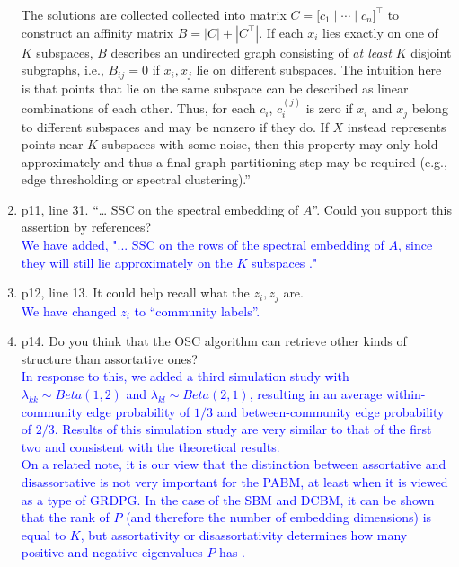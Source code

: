 \documentclass[
]{article}
\begin{document}
\begin{enumerate}
{  The solutions are collected collected into matrix
  \(C = \bigl[ c_1 \mid \cdots \mid c_n \bigr]^\top\) to
  construct an affinity matrix \(B = |C| + |C^\top|\). If each \(x_i\) lies
  exactly on one of \(K\) subspaces, \(B\) describes an undirected graph
  consisting of {\em at least} \(K\) disjoint subgraphs, i.e., \(B_{ij} = 0\) if \(x_i, x_j\) lie on different subspaces. 
  The intuition here is that points that lie on the same subspace can be described as linear combinations of each other. 
  Thus, for each $c_i$, $c_i^{(j)}$ is zero if $x_i$ and $x_j$ belong to different subspaces and may be nonzero if they do. 
  If \(X\) instead represents points near \(K\) subspaces with some noise, 
  then this property may only hold approximately and thus 
  a final graph partitioning step may be required 
  (e.g., edge thresholding or spectral clustering).''
  }
\item
  p11, line 31. ``\ldots{} SSC on the spectral embedding of \(A\)''.
  Could you support this assertion by references?\\
  \textcolor{blue}{
  We have added, "... SSC on the rows of the spectral embedding of $A$, since they will still lie approximately on the $K$ subspaces \citep{rubindelanchy2017statistical}."
  }
\item
  p12, line 13. It could help recall what the \(z_i, z_j\) are.\\
  \textcolor{blue}{
  We have changed $z_i$ to ``community labels''.
  }
\item
  p14. Do you think that the OSC algorithm can retrieve other kinds of
  structure than assortative ones?\\
  \textcolor{blue}{
  In response to this, we added a third simulation study with $\lambda_{kk} \sim Beta(1,2)$ and $\lambda_{kl} \sim Beta(2,1)$, resulting in an average within-community edge probability of $1/3$ and between-community edge probability of $2/3$. 
  Results of this simulation study are very similar to that of the first two and consistent with the theoretical results.
  }\\
  \textcolor{blue}{
  On a related note, it is our view that the distinction between assortative and disassortative is not very important for the PABM, at least when it is viewed as a type of GRDPG. 
  In the case of the SBM and DCBM, it can be shown that the rank of $P$ (and therefore the number of embedding dimensions) is equal to $K$, but assortativity or disassortativity determines how many positive and negative eigenvalues $P$ has \citep{rubindelanchy2017statistical}. 
}
\end{enumerate}
\end{document}
